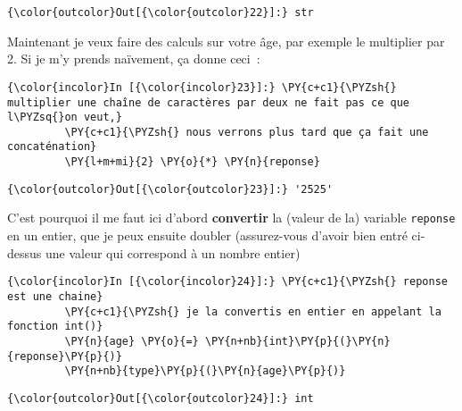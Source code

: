 \begin{Verbatim}[commandchars=\\\{\},frame=single,framerule=0.3mm,rulecolor=\color{cellframecolor}]
{\color{outcolor}Out[{\color{outcolor}22}]:} str
\end{Verbatim}
            
    Maintenant je veux faire des calculs sur votre âge, par exemple le
multiplier par 2. Si je m'y prends naïvement, ça donne ceci~:

    \begin{Verbatim}[commandchars=\\\{\},frame=single,framerule=0.3mm,rulecolor=\color{cellframecolor}]
{\color{incolor}In [{\color{incolor}23}]:} \PY{c+c1}{\PYZsh{} multiplier une chaîne de caractères par deux ne fait pas ce que l\PYZsq{}on veut,}
         \PY{c+c1}{\PYZsh{} nous verrons plus tard que ça fait une concaténation}
         \PY{l+m+mi}{2} \PY{o}{*} \PY{n}{reponse}
\end{Verbatim}


\begin{Verbatim}[commandchars=\\\{\},frame=single,framerule=0.3mm,rulecolor=\color{cellframecolor}]
{\color{outcolor}Out[{\color{outcolor}23}]:} '2525'
\end{Verbatim}
            
    C'est pourquoi il me faut ici d'abord \textbf{convertir} la (valeur de
la) variable \texttt{reponse} en un entier, que je peux ensuite doubler
(assurez-vous d'avoir bien entré ci-dessus une valeur qui correspond à
un nombre entier)

    \begin{Verbatim}[commandchars=\\\{\},frame=single,framerule=0.3mm,rulecolor=\color{cellframecolor}]
{\color{incolor}In [{\color{incolor}24}]:} \PY{c+c1}{\PYZsh{} reponse est une chaine}
         \PY{c+c1}{\PYZsh{} je la convertis en entier en appelant la fonction int()}
         \PY{n}{age} \PY{o}{=} \PY{n+nb}{int}\PY{p}{(}\PY{n}{reponse}\PY{p}{)}
         \PY{n+nb}{type}\PY{p}{(}\PY{n}{age}\PY{p}{)}
\end{Verbatim}


\begin{Verbatim}[commandchars=\\\{\},frame=single,framerule=0.3mm,rulecolor=\color{cellframecolor}]
{\color{outcolor}Out[{\color{outcolor}24}]:} int
\end{Verbatim}
            
